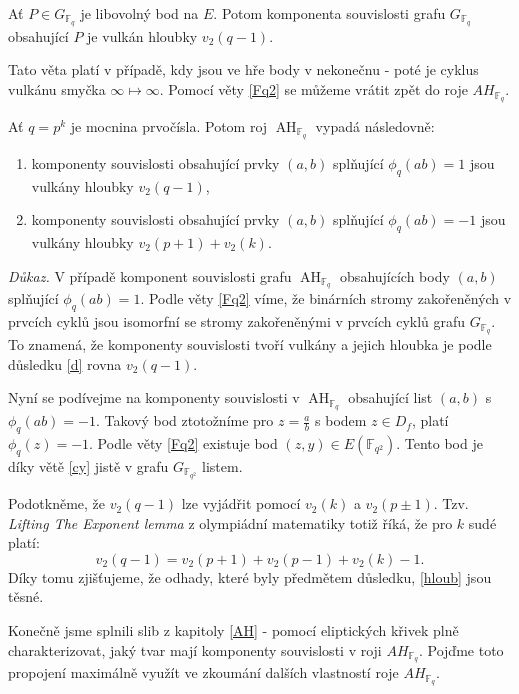 \documentclass[12pt]{report}
\DeclareMathOperator{\AH}{AH}
\begin{document}
\begin{dusledek}\label{d}
Ať $P \in G_{\mathbb{F}_q}$ je libovolný bod na $E$. Potom komponenta souvislosti grafu $G_{\mathbb{F}_q}$ obsahující $P$ je vulkán hloubky $v_2(q-1)$.
\end{dusledek}

Tato věta platí v případě, kdy jsou ve hře body v nekonečnu - poté je cyklus vulkánu smyčka $\infty \longmapsto \infty$. Pomocí věty \ref{Fq2} se můžeme vrátit zpět do roje $AH_{\mathbb{F}_q}$.

\begin{veta}
Ať $q = p^k$ je mocnina prvočísla. Potom roj $\AH_{\mathbb{F}_q}$ vypadá následovně:
\begin{enumerate}
\item komponenty souvislosti obsahující prvky $(a,b)$ splňující $\phi_q (ab) = 1$ jsou vulkány hloubky $v_2(q-1)$,
\item komponenty souvislosti obsahující prvky $(a,b)$ splňující $\phi_q (ab) = -1$ jsou vulkány hloubky $v_2 (p+1) + v_2(k)$.
\end{enumerate} 
\end{veta}

\noindent \textit{Důkaz.} V případě komponent souvislosti grafu $\AH_{\mathbb{F}_q}$ obsahujících body $(a,b)$ splňující $\phi_q(ab) = 1$. Podle věty \ref{Fq2} víme, že binárních stromy zakořeněných v prvcích cyklů jsou isomorfní se stromy zakořeněnými v prvcích cyklů grafu $G_{\mathbb{F}_q}$. To znamená, že komponenty souvislosti tvoří vulkány a jejich hloubka je podle důsledku \ref{d} rovna $v_2 (q-1)$. 

Nyní se podívejme na komponenty souvislosti v $\AH_{\mathbb{F}_q}$ obsahující list $(a,b)$ s $\phi_q(ab) = -1$. Takový bod ztotožníme pro $z = \frac{a}{b}$ s bodem $z \in D_f$, platí $\phi_q(z) = -1$. Podle věty \ref{Fq2} existuje bod $(z,y) \in E(\mathbb{F}_{q^2})$. Tento bod je díky větě \ref{cy} jistě v grafu $G_{\mathbb{F}_{q^2}}$ listem. 



\begin{poznamka}
Podotkněme, že $v_2 (q-1)$ lze vyjádřit pomocí $v_2(k)$ a $v_2(p \pm 1)$. Tzv.  \textit{Lifting The Exponent lemma} z olympiádní matematiky totiž říká, že pro $k$ sudé platí: $$v_2(q-1) = v_2(p+1)+v_2(p-1)+v_2(k)-1.$$ Díky tomu zjišťujeme, že odhady, které byly předmětem důsledku, \ref{hloub} jsou těsné.
\end{poznamka}


Konečně jsme splnili slib z kapitoly \ref{AH} - pomocí eliptických křivek plně charakterizovat, jaký tvar mají komponenty souvislosti v roji $AH_{\mathbb{F}_q}$. Pojďme toto propojení maximálně využít ve zkoumání dalších vlastností roje $AH_{\mathbb{F}_q}$.
\end{document}
